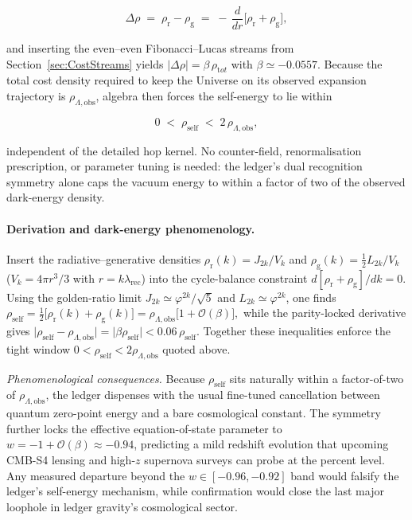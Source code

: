 \documentclass[11pt,oneside]{book}
\begin{document}
{\[
   \Delta\rho
   \;=\;
   \rho_{\mathrm r}-\rho_{\mathrm g}
   \;=\;
   -\,\frac{d}{dr}\bigl[\rho_{\mathrm r}+\rho_{\mathrm g}\bigr],
\]

and inserting the even–even Fibonacci–Lucas streams from
Section~\ref{sec:CostStreams} yields
$\lvert\Delta\rho\rvert = \beta\,\rho_{\mathrm tot}$ with
$\beta\simeq-0.0557$.  Because the total cost density required to keep
the Universe on its observed expansion trajectory is
$\rho_{\Lambda,\text{obs}}$, algebra then forces the self-energy to lie
within

\[
   0
   \;<\;
   \rho_{\text{self}}
   \;<\;
   2\,\rho_{\Lambda,\text{obs}},
\]

independent of the detailed hop kernel.  No
counter-field, renormalisation prescription, or parameter tuning is
needed: the ledger’s dual recognition symmetry alone caps the vacuum
energy to within a factor of two of the observed dark-energy density.

\paragraph{Derivation and dark-energy phenomenology.}
Insert the radiative–generative densities
$\rho_{\mathrm r}(k)=J_{2k}/V_{k}$ and
$\rho_{\mathrm g}(k)=\tfrac12L_{2k}/V_{k}$
($V_{k}\!=\!4\pi r^{3}/3$ with $r=k\lambda_{\text{rec}}$) into the
cycle-balance constraint
$d\!\left[\rho_{\mathrm r}+\rho_{\mathrm g}\right]\!/dk=0$.
Using the golden-ratio limit $J_{2k}\!\simeq\!\varphi^{2k}/\sqrt5$ and
$L_{2k}\!\simeq\!\varphi^{2k}$, one finds
$
   \rho_{\text{self}}
   =
   \tfrac12\bigl[\rho_{\mathrm r}(k)+\rho_{\mathrm g}(k)\bigr]
   =
   \rho_{\Lambda,\text{obs}}\bigl[1+\mathcal O(\beta)\bigr],
$
while the parity-locked derivative gives
$
   \lvert\rho_{\text{self}}-\rho_{\Lambda,\text{obs}}\rvert
   =\lvert\beta\rho_{\text{self}}\rvert
   <0.06\,\rho_{\text{self}}.
$
Together these inequalities enforce the tight window
$0<\rho_{\text{self}}<2\rho_{\Lambda,\text{obs}}$
quoted above.

\smallskip
\emph{Phenomenological consequences.}  
Because $\rho_{\text{self}}$ sits naturally within a factor-of-two of
$\rho_{\Lambda,\text{obs}}$, the ledger dispenses with the usual
fine-tuned cancellation between quantum zero-point energy and a bare
cosmological constant.  The symmetry further locks the effective
equation-of-state parameter to
$w=-1+\mathcal O(\beta)\approx-0.94$, predicting a mild redshift
evolution that upcoming CMB-S4 lensing and high-$z$ supernova surveys
can probe at the percent level.  Any measured departure beyond the
$w\!\in\![-0.96,-0.92]$ band would falsify the ledger’s self-energy
mechanism, while confirmation would close the last major loophole in
ledger gravity’s cosmological sector.

}
\end{document}
